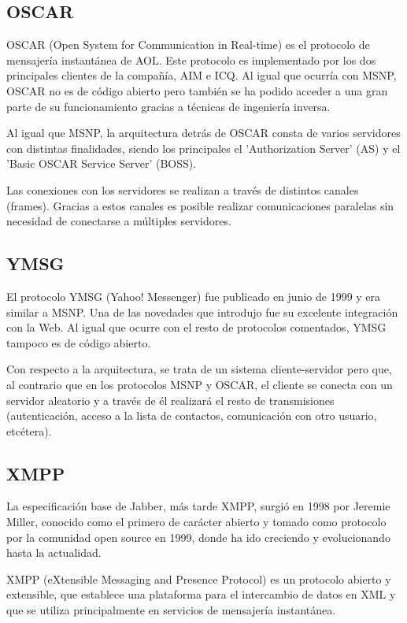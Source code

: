 \subsection{OSCAR}

OSCAR (Open System for Communication in Real-time) es el protocolo de mensajería instantánea de AOL. Este protocolo es implementado por los dos principales clientes de la compañía, AIM e ICQ. Al igual que ocurría con MSNP, OSCAR no es de código abierto pero también se ha podido acceder a una gran parte de su funcionamiento gracias a técnicas de ingeniería inversa.

Al igual que MSNP, la arquitectura detrás de OSCAR consta de varios servidores con distintas finalidades, siendo los principales el 'Authorization Server' (AS) y el 'Basic OSCAR Service Server' (BOSS).

Las conexiones con los servidores se realizan a través de distintos canales (frames). Gracias a estos canales es posible realizar comunicaciones paralelas sin necesidad de conectarse a múltiples servidores.

\subsection{YMSG}

El protocolo YMSG (Yahoo! Messenger) fue publicado en junio de 1999 y era similar a MSNP. Una de las novedades que introdujo fue su excelente integración con la Web. Al igual que ocurre con el resto de protocolos comentados, YMSG tampoco es de código abierto.

Con respecto a la arquitectura, se trata de un sistema cliente-servidor pero que, al contrario que en los protocolos MSNP y OSCAR, el cliente se conecta con un servidor aleatorio y a través de él realizará el resto de transmisiones (autenticación, acceso a la lista de contactos, comunicación con otro usuario, etcétera).

\subsection{XMPP}

La especificación base de Jabber, más tarde XMPP, surgió en 1998 por Jeremie Miller, conocido como el primero de carácter abierto y tomado como protocolo por la comunidad open source en 1999, donde ha ido creciendo y evolucionando hasta la actualidad.

XMPP (eXtensible Messaging and Presence Protocol) es un protocolo abierto y extensible, que establece una plataforma para el intercambio de datos en XML y que se utiliza principalmente en servicios de mensajería instantánea.

